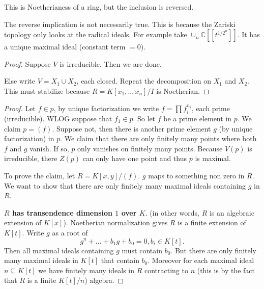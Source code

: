 \begin{remark}
    This is Noetherianess of a ring, but the inclusion is reversed.
\end{remark}
\begin{remark}
    The reverse implication is not necessarily true. This is because the Zariski topology only looks at the radical ideals. For example take $\cup_n\mathbb{C}[[t^{1/2^n}]]$. It has a unique maximal ideal (constant term $=0$).
\end{remark}
\begin{proof}
    Suppose $V$ is irreducible. Then we are done. 

    Else write $V=X_1\cup X_2$, each closed. Repeat the decomposition on $X_1$ and $X_2$. This must stabilize because $R=K[x_1,..,x_n]/I$ is Noetherian.
\end{proof}
\begin{proof}
    Let $f\in p$, by unique factorization we write $f=\prod f_i^{n_i}$, each prime (irreducible). WLOG suppose that $f_1\in p$. So let $f$ be a prime element in $p$. We claim $p=(f)$. Suppose not, then there is another prime element $g$ (by unique factorization) in $p$. We claim that there are only finitely many points where both $f$ and $g$ vanish. If so, $p$ only vanishes on finitely many points. Because $V(p)$ is irreducible, there $Z(p)$ can only have one point and thus $p$ is maximal.
    
    
    To prove the claim, let $R=K[x,y]/(f)$. $g$ maps to something non zero in $R$. We want to show that there are only finitely many maximal ideals containing $g$ in $R$. 

    \textbf{$R$ has transendence dimension $1$ over $K$}. (in other words, $R$ is an algebraic extension of $K[x]$). Noetherian normalization gives $R$ is a finite extension of $K[t]$. Write $g$ as a root of  \[
    g^n + ...+b_1g+b_0=0, b_i\in K[t].
    \]
    Then all maximal ideals containing $g$ must contain $b_0$. But there are only finitely many maximal ideals in $K[t]$ that contain $b_0$. Moreover for each maximal ideal $n\subseteq K[t]$ we have finitely many ideals in $R$ contracting to $n$ (this is by the fact that $R$ is a finite $K[t]/n$) algebra.
\end{proof}
